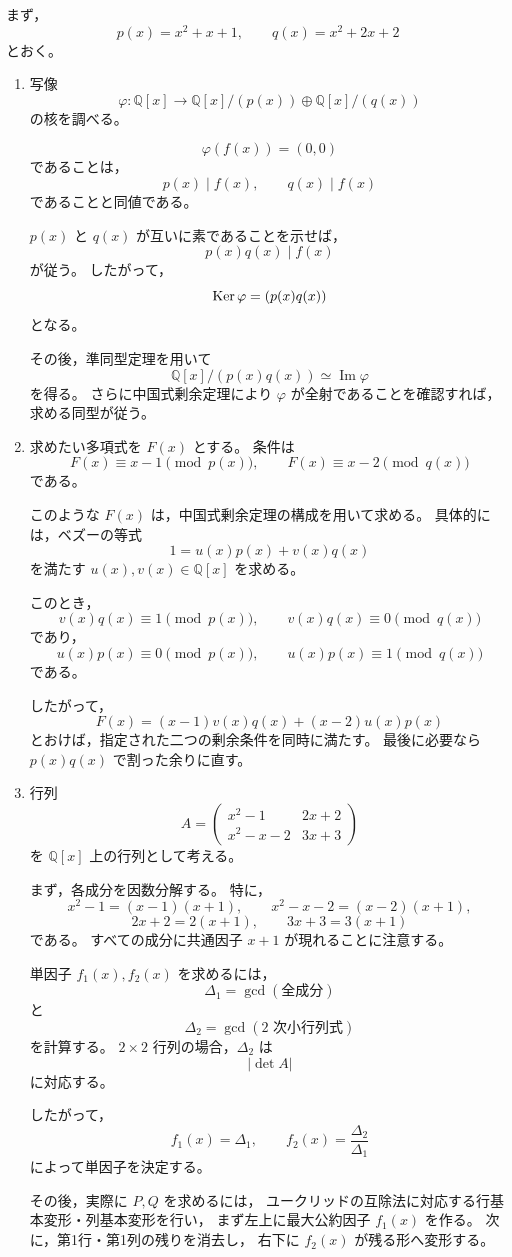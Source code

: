 \begin{strategy}
	まず，
	\[
	p(x)=x^2+x+1,
	\qquad
	q(x)=x^2+2x+2
	\]
	とおく。
	
	\begin{enumerate}
		\item[(A1)]
		写像
		\[
		\varphi:\mathbb{Q}[x]\to
		\mathbb{Q}[x]/(p(x))
		\oplus
		\mathbb{Q}[x]/(q(x))
		\]
		の核を調べる。
		
		\[
		\varphi(f(x))=(0,0)
		\]
		であることは，
		\[
		p(x)\mid f(x),
		\qquad
		q(x)\mid f(x)
		\]
		であることと同値である。
		
		\(p(x)\) と \(q(x)\) が互いに素であることを示せば，
		\[
		p(x)q(x)\mid f(x)
		\]
		が従う。
		したがって，
		\[
		\operatorname{Ker}\varphi=(p(x)q(x))
		\]
		となる。
		
		その後，準同型定理を用いて
		\[
		\mathbb{Q}[x]/(p(x)q(x))
		\simeq
		\operatorname{Im}\varphi
		\]
		を得る。
		さらに中国式剰余定理により \(\varphi\) が全射であることを確認すれば，
		求める同型が従う。
		
		\item[(A2)]
		求めたい多項式を \(F(x)\) とする。
		条件は
		\[
		F(x)\equiv x-1 \pmod{p(x)},
		\qquad
		F(x)\equiv x-2 \pmod{q(x)}
		\]
		である。
		
		このような \(F(x)\) は，中国式剰余定理の構成を用いて求める。
		具体的には，ベズーの等式
		\[
		1=u(x)p(x)+v(x)q(x)
		\]
		を満たす \(u(x),v(x)\in\mathbb{Q}[x]\) を求める。
		
		このとき，
		\[
		v(x)q(x)\equiv 1 \pmod{p(x)},
		\qquad
		v(x)q(x)\equiv 0 \pmod{q(x)}
		\]
		であり，
		\[
		u(x)p(x)\equiv 0 \pmod{p(x)},
		\qquad
		u(x)p(x)\equiv 1 \pmod{q(x)}
		\]
		である。
		
		したがって，
		\[
		F(x)
		=
		(x-1)v(x)q(x)
		+
		(x-2)u(x)p(x)
		\]
		とおけば，指定された二つの剰余条件を同時に満たす。
		最後に必要なら \(p(x)q(x)\) で割った余りに直す。
		
		\item[(B)]
		行列
		\[
		A=
		\begin{pmatrix}
			x^2-1 & 2x+2\\
			x^2-x-2 & 3x+3
		\end{pmatrix}
		\]
		を \(\mathbb{Q}[x]\) 上の行列として考える。
		
		まず，各成分を因数分解する。
		特に，
		\[
		x^2-1=(x-1)(x+1),
		\qquad
		x^2-x-2=(x-2)(x+1),
		\]
		\[
		2x+2=2(x+1),
		\qquad
		3x+3=3(x+1)
		\]
		である。
		すべての成分に共通因子 \(x+1\) が現れることに注意する。
		
		単因子 \(f_1(x),f_2(x)\) を求めるには，
		\[
		\Delta_1=\gcd(\text{全成分})
		\]
		と
		\[
		\Delta_2=\gcd(\text{\(2\) 次小行列式})
		\]
		を計算する。
		\(2\times 2\) 行列の場合，\(\Delta_2\) は
		\[
		|\det A|
		\]
		に対応する。
		
		したがって，
		\[
		f_1(x)=\Delta_1,
		\qquad
		f_2(x)=\frac{\Delta_2}{\Delta_1}
		\]
		によって単因子を決定する。
		
		その後，実際に \(P,Q\) を求めるには，
		ユークリッドの互除法に対応する行基本変形・列基本変形を行い，
		まず左上に最大公約因子 \(f_1(x)\) を作る。
		次に，第1行・第1列の残りを消去し，
		右下に \(f_2(x)\) が残る形へ変形する。
	\end{enumerate}
\end{strategy}
